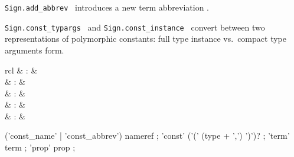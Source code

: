 \begin{isabellebody}
\begin{isamarkuptext}
\begin{description}
  \item \verb|Sign.add_abbrev|~
  introduces a new term abbreviation .

  \item \verb|Sign.const_typargs|~ and \verb|Sign.const_instance|~
  convert between two representations of polymorphic constants: full
  type instance vs.\ compact type arguments form.

  \end{description}%
\end{isamarkuptext}%
\isamarkuptrue%
%
\endisatagmlref
{\isafoldmlref}%
%
\isadelimmlref
%
\endisadelimmlref
%
\isadelimmlantiq
%
\endisadelimmlantiq
%
\isatagmlantiq
%
\begin{isamarkuptext}%
\begin{matharray}{rcl}
  \hypertarget{ML antiquotation.const-name}{\hyperlink{ML antiquotation.const-name}{\mbox{}}} & : &  \\
  \hypertarget{ML antiquotation.const-abbrev}{\hyperlink{ML antiquotation.const-abbrev}{\mbox{}}} & : &  \\
  \hypertarget{ML antiquotation.const}{\hyperlink{ML antiquotation.const}{\mbox{}}} & : &  \\
  \hypertarget{ML antiquotation.term}{\hyperlink{ML antiquotation.term}{\mbox{}}} & : &  \\
  \hypertarget{ML antiquotation.prop}{\hyperlink{ML antiquotation.prop}{\mbox{}}} & : &  \\
  \end{matharray}

  \begin{rail}
  ('const_name' | 'const_abbrev') nameref
  ;
  'const' ('(' (type + ',') ')')?
  ;
  'term' term
  ;
  'prop' prop
  ;
  \end{rail}


\end{isamarkuptext}
\end{isabellebody}
